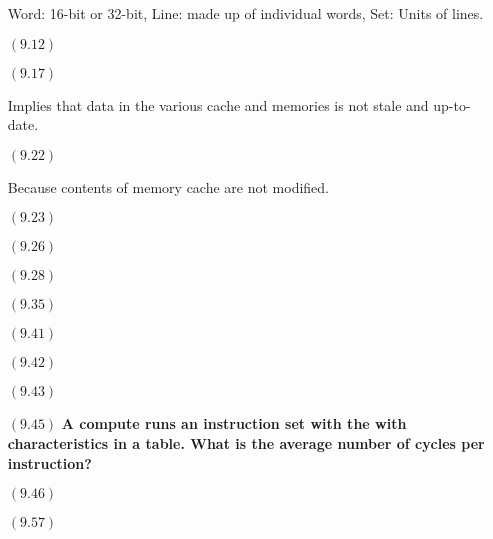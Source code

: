 \documentclass[letterpaper,10pt,titlepage]{article}
\begin{document}
\begin{enumerate}
Word: 16-bit or 32-bit, Line: made up of individual words, Set: Units of lines.

\item[$(9.12)$] \textbf{}

\item[$(9.17)$] \textbf{}

Implies that data in the various cache and memories is not stale and up-to-date.
	
\item[$(9.22)$] \textbf{}

Because contents of memory cache are not modified.

\item[$(9.23)$] \textbf{}

\item[$(9.26)$] \textbf{}

\item[$(9.28)$] \textbf{}

\item[$(9.35)$] \textbf{}

\item[$(9.41)$] \textbf{}

\item[$(9.42)$] \textbf{}

\item[$(9.43)$] \textbf{}

\item[$(9.45)$] \textbf{A compute runs an instruction set with the with characteristics in a table. What is the average number of cycles per instruction?}

\item[$(9.46)$] \textbf{}

\item[$(9.57)$] \textbf{}

\end{enumerate}
\end{document}
